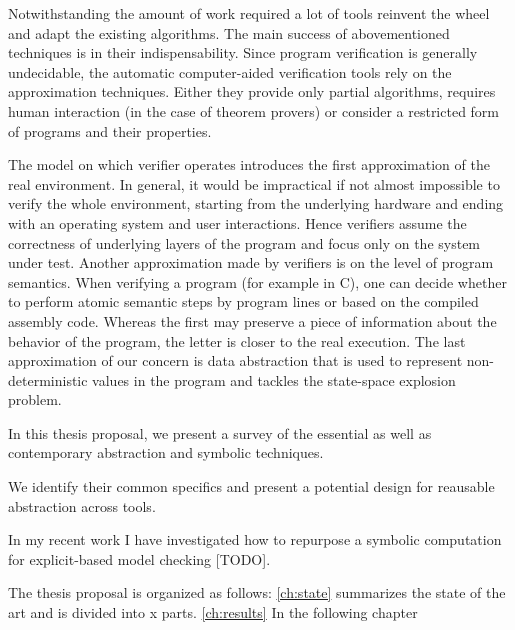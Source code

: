 Notwithstanding the amount of work required a lot of tools reinvent the wheel and adapt the existing algorithms.
The main success of abovementioned techniques is in their indispensability.
Since program verification is generally undecidable, the automatic computer-aided verification tools rely on the approximation techniques.
Either they provide only partial algorithms, requires human interaction (in the case of theorem provers) or consider a restricted form of programs and their properties.

The model on which verifier operates introduces the first approximation of the real environment.
In general, it would be impractical if not almost impossible to verify the whole environment, starting from the underlying hardware and ending with an operating system and user interactions.
Hence verifiers assume the correctness of underlying layers of the program and focus only on the system under test.
Another approximation made by verifiers is on the level of program semantics.  When verifying a program (for example in C), one can decide whether to perform atomic semantic steps by program lines or based on the compiled assembly code. Whereas the first may preserve a piece of information about the behavior of the program, the letter is closer to the real execution.
The last approximation of our concern is data abstraction that is used to represent non-deterministic values in the program and tackles the state-space explosion problem.

In this thesis proposal, we present a survey of the essential as well as contemporary abstraction and symbolic techniques.

We identify their common specifics and present a potential design for reausable
abstraction across tools.

In my recent work I have investigated how to repurpose a symbolic computation for explicit-based model checking [TODO].




The thesis proposal is organized as follows: \autoref{ch:state} summarizes the state of the art and is divided into {\color{red}x} parts. \autoref{ch:results}
In the following chapter

